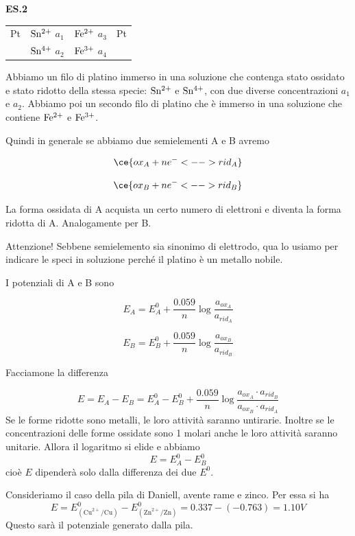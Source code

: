 \vspace{0.2cm}\textbf{ES.2}

\begin{center}
    \begin{tabular}{p{0.6cm}|p{1.6cm}||p{1.6cm}|p{2cm}}
        Pt & $\rm Sn^{2+}$ $a_1$ & $\rm Fe^{2+}$ $a_3$ & Pt\\[0.5ex]
         & $\rm Sn^{4+}$ $a_2$ & $\rm Fe^{3+}$ $a_4$&\\[0.5ex]
    \end{tabular}
\end{center}

Abbiamo un filo di platino immerso in una soluzione che contenga stato ossidato e stato ridotto della stessa specie: $\rm Sn^{2+}$ e $\rm Sn^{4+}$, con due diverse concentrazioni $a_1$ e $a_2$. Abbiamo poi un secondo filo di platino che è immerso in una soluzione che contiene $\rm Fe^{2+}$ e $\rm Fe^{3+}$.

Quindi in generale se abbiamo due semielementi A e B avremo

$$\ce{ox_A + ne^- <--> rid_A}$$

$$\ce{ox_B + ne^- <--> rid_B}$$

La forma ossidata di A acquista un certo numero di elettroni e diventa la forma ridotta di A. Analogamente per B.

Attenzione! Sebbene semielemento sia sinonimo di elettrodo, qua lo usiamo per indicare le speci in soluzione perché il platino è un metallo nobile.

I potenziali di A e B sono

$$E_A = E^0_{A} + \frac{0.059}{n} \log \frac{a_{ox_{A}}}{a_{rid_{A}}}$$

$$E_B = E^0_{B} + \frac{0.059}{n} \log \frac{a_{ox_{B}}}{a_{rid_{B}}}$$

Facciamone la differenza

$$E = E_A - E_B = E^0_{A} - E^0_{B} + \frac{0.059}{n} \log \frac{a_{ox_{A}} \cdot a_{rid_{B}}}{a_{ox_{B}}  \cdot a_{rid_{A}}}$$
Se le forme ridotte sono metalli, le loro attività saranno untirarie. Inoltre se le concentrazioni delle forme ossidate sono 1 molari anche le loro attività saranno unitarie. Allora il logaritmo si elide e abbiamo
$$E=E^0_{A} - E^0_{B}$$
cioè $E$ dipenderà solo dalla differenza dei due $E^0$.

Consideriamo il caso della pila di Daniell, avente rame e zinco. Per essa si ha
$$E=E^0_{(\text{Cu}^{2+}/\text{Cu})} - E^0_{(\text{Zn}^{2+}/\text{Zn})} = 0.337 - (-0.763) = 1.10 V$$
Questo sarà il potenziale generato dalla pila.

